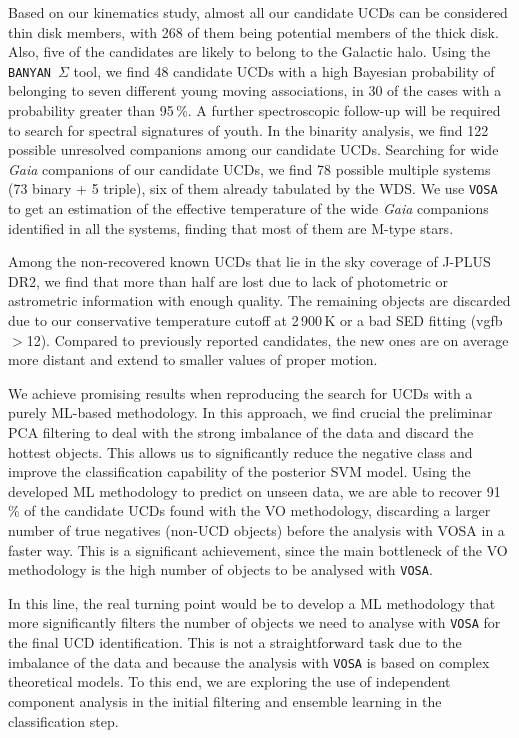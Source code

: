Based on our kinematics study, almost all our candidate UCDs can be considered thin disk members, with 268 of them being potential members of the thick disk. Also, five of the candidates are likely to belong to the Galactic halo. Using the \texttt{BANYAN}~$\Sigma$ tool, we find 48 candidate UCDs with a high Bayesian probability of belonging to seven different young moving associations, in 30 of the cases with a probability greater than 95\,\%. A further spectroscopic follow-up will be required to search for spectral signatures of youth. In the binarity analysis, we find 122 possible unresolved companions among our candidate UCDs. Searching for wide \textit{Gaia} companions of our candidate UCDs, we find 78 possible multiple systems (73 binary + 5 triple), six of them already tabulated by the WDS. We use \texttt{VOSA} to get an estimation of the effective temperature of the wide \textit{Gaia} companions identified in all the systems, finding that most of them are M-type stars.

Among the non-recovered known UCDs that lie in the sky coverage of J-PLUS DR2, we find that more than half are lost due to lack of photometric or astrometric information with enough quality. The remaining objects are discarded due to our conservative temperature cutoff at 2\,900\,K or a bad SED fitting (vgfb$>$12). Compared to previously reported candidates, the new ones are on average more distant and extend to smaller values of proper motion.

We achieve promising results when reproducing the search for UCDs with a purely ML-based methodology. In this approach, we find crucial the preliminar PCA filtering to deal with the strong imbalance of the data and discard the hottest objects. This allows us to significantly reduce the negative class and improve the classification capability of the posterior SVM model. Using the developed ML methodology to predict on unseen data, we are able to recover 91\,\% of the candidate UCDs found with the VO methodology, discarding a larger number of true negatives (non-UCD objects) before the analysis with VOSA in a faster way. This is a significant achievement, since the main bottleneck of the VO methodology is the high number of objects to be analysed with \texttt{VOSA}.

In this line, the real turning point would be to develop a ML methodology that more significantly filters the number of objects we need to analyse with \texttt{VOSA} for the final UCD identification. This is not a straightforward task due to the imbalance of the data and because the analysis with \texttt{VOSA} is based on complex theoretical models. To this end, we are exploring the use of independent component analysis in the initial filtering and ensemble learning in the classification step.

